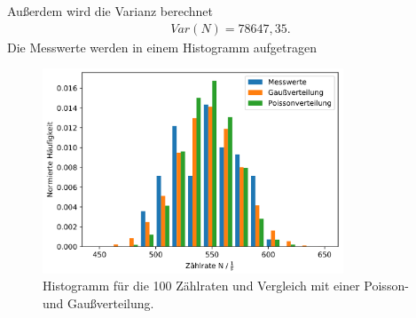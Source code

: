 \noindent Außerdem wird die Varianz berechnet
\begin{align*}
Var(N) = 78647,35 .
\end{align*}
Die Messwerte werden in einem Histogramm aufgetragen
\begin{figure}[H]
  \centering
  \includegraphics[width=0.8\textwidth]{h.PNG}
  \caption{Histogramm für die 100 Zählraten und Vergleich mit einer Poisson- und Gaußverteilung. }
  \label{fig:plot}
\end{figure}


